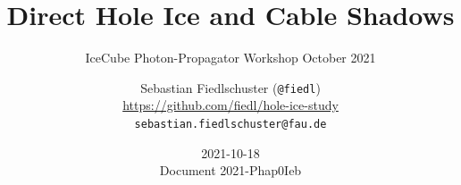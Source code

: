 \documentclass[green, 12pt]{beamer}
\title[Direct Hole Ice and Cable Shadows | IceCube Photon-Propagator Workshop October 2021]{Direct Hole Ice and Cable Shadows}
\subtitle{IceCube Photon-Propagator Workshop October 2021}
\date{2021-10-18 \\ \vspace*{2mm}\tiny{Document 2021-Phap0Ieb} \normalsize}
\author[Sebastian Fiedlschuster, ECAP Erlangen, 2021-10-18]{Sebastian Fiedlschuster (\texttt{@fiedl}) \\ \tiny{\url{https://github.com/fiedl/hole-ice-study}} \\ \tiny\texttt{sebastian.fiedlschuster@fau.de}}
\institute{Erlangen Centre for Astroparticle Physics}
\newif\ifplacelogo %
\begin{document}



\placelogofalse

  
%  
  
  
%  

%   
  

%   
%   
%   
%   
%   




\end{document}
